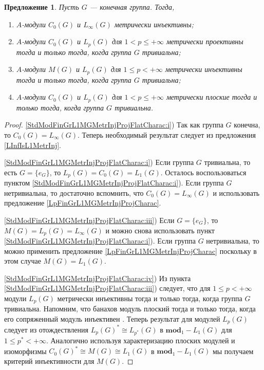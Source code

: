 \documentclass{article}
\numberwithin{equation}{section}
\theoremstyle{plain}
\newtheorem{propos}{Предложение}
\theoremstyle{definition}
\newtheorem{proof}{Доказательство}\def\theproof{}
\newcommand{\isom}{\mathop{\mathbin{\cong}}}
\begin{document}
\begin{fulltext}
\begin{propos}\label{StdModFinGrL1MGMetrInjProjFlatCharac} 
Пусть $G$ --- конечная группа. Тогда,
\begin{enumerate}
    \item $A$-модули $C_0(G)$ и $L_\infty(G)$ метрически инъективны;
    \label{StdModFinGrL1MGMetrInjProjFlatCharac:i}
    \item $A$-модули $C_0(G)$ и $L_p(G)$ для $1<p\leq +\infty$ 
    метрически проективны тогда и только тогда, когда группа $G$ тривиальна;
    \label{StdModFinGrL1MGMetrInjProjFlatCharac:ii}
    \item $A$-модули $M(G)$ и $L_p(G)$ для $1\leq p< +\infty$ 
    метрически инъективны тогда и только тогда, когда группа $G$ тривиальна;
    \label{StdModFinGrL1MGMetrInjProjFlatCharac:iii}
    \item $A$-модули $C_0(G)$ и $L_p(G)$ для $1<p\leq +\infty$ 
    метрически плоские тогда и только тогда, когда группа $G$ тривиальна.
    \label{StdModFinGrL1MGMetrInjProjFlatCharac:iv}
\end{enumerate}
\end{propos}
\begin{proof}
\ref{StdModFinGrL1MGMetrInjProjFlatCharac:i}) Так как группа $G$ конечна, то 
$C_0(G)=L_\infty(G)$. Теперь необходимый результат следует из 
предложения \ref{LInfIsL1MetrInj}.

\ref{StdModFinGrL1MGMetrInjProjFlatCharac:i}) Если группа $G$ тривиальна, 
то есть $G=\{e_G\}$, то $L_p(G)=C_0(G)=L_1(G)$. Осталось 
воспользоваться пунктом \ref{StdModFinGrL1MGMetrInjProjFlatCharac:i}). 
Если группа $G$ нетривиальна, то достаточно вспомнить, что 
$C_0(G)=L_\infty(G)$ и использовать предложение \ref{LpFinGrL1MGMetrInjProjCharac}.

\ref{StdModFinGrL1MGMetrInjProjFlatCharac:iii}) Если $G=\{e_G\}$, 
то $M(G)=L_p(G)=L_\infty(G)$ и можно снова использовать пункт
\ref{StdModFinGrL1MGMetrInjProjFlatCharac:i}). Если группа $G$ нетривиальна, 
то можно применить предложение \ref{LpFinGrL1MGMetrInjProjCharac} поскольку 
в этом случае $M(G)=L_1(G)$.

\ref{StdModFinGrL1MGMetrInjProjFlatCharac:iv}) Из пункта 
\ref{StdModFinGrL1MGMetrInjProjFlatCharac:iii}) следует, что для 
$1\leq p<+\infty$ модули $L_p(G)$ метрически инъективны тогда и только тогда, 
когда группа $G$ тривиальна. Напомним, что банахов модуль плоский тогда и 
только тогда, когда его сопряженный модуль инъективен 
\cite[предложение~2.21]{NemGeomProjInjFlatBanMod}. Теперь результат 
для модулей $L_p(G)$ следует из отождествления $L_p(G)^*\isom L_{p^*}(G)$ 
в $\mathbf{mod}_1-L_1(G)$ для $1\leq p^*< +\infty$. Аналогично 
используя характеризацию плоских модулей и изоморфизмы 
$C_0(G)^*\isom M(G)\isom L_1(G)$ в $\mathbf{mod}_1-L_1(G)$ мы получаем 
критерий инъективности для $M(G)$.
\end{proof}


\end{fulltext}
\end{document}
